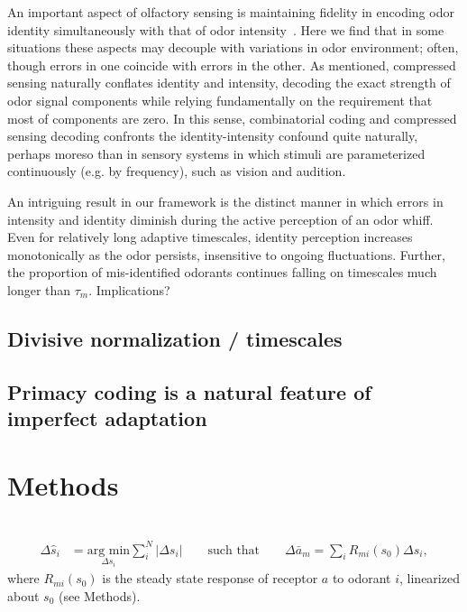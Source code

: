 An important aspect of olfactory sensing is maintaining fidelity in encoding odor identity simultaneously with that of odor intensity~\cite{Laruents papers}. Here we find that in some situations these aspects may decouple with variations in odor environment; often, though errors in one coincide with errors in the other. As mentioned, compressed sensing naturally conflates identity and intensity, decoding the exact strength of odor signal components while relying fundamentally on the requirement that most of components are zero. In this sense, combinatorial coding and compressed sensing decoding confronts the identity-intensity confound quite naturally, perhaps moreso than in sensory systems in which stimuli are parameterized continuously (e.g. by frequency), such as vision and audition.

An intriguing result in our framework is the distinct manner in which errors in intensity and identity diminish during the active perception of an odor whiff. Even for relatively long adaptive timescales, identity perception increases monotonically as the odor persists, insensitive to ongoing fluctuations. Further, the proportion of mis-identified odorants continues falling on timescales much longer than $\tau_m$. {\color{blue} Implications?}


\subsection*{Divisive normalization / timescales}


\subsection*{Primacy coding is a natural feature of imperfect adaptation}




\section*{Methods}

\section*{}



\begin{align}
\Delta \hat s_i &= \underset{\Delta s_i}{\text{arg min}} \sum_i^N|\Delta s_i| \qquad \text{such that} \qquad \Delta \bar a_m = \sum_i R_{mi}(s_0) \Delta s_i,
\end{align}
where $R_{mi}(s_0)$ is the steady state response of receptor $a$ to odorant $i$, linearized about $s_0$ (see Methods). 

